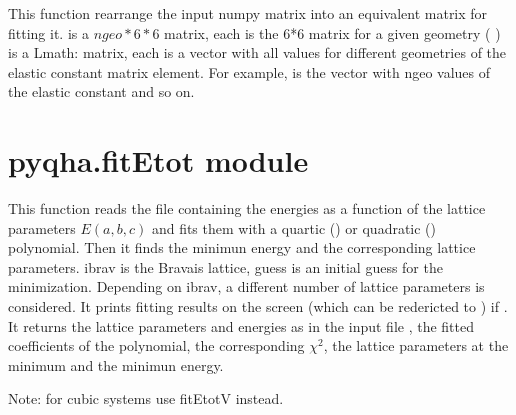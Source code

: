 \documentclass[letterpaper,10pt,english]{sphinxmanual}
\begin{document}

\begin{fulllineitems}
This function rearrange the input numpy matrix  into an equivalent matrix 
for fitting it.
 is a \(ngeo*6*6\) matrix, each  is the 6*6  matrix for a given geometry (  )
 is a Lmath: matrix, each  is a vector with all values for different
geometries of the  elastic constant matrix element. For example, 
is the vector with ngeo values of the  elastic constant and so on.

\end{fulllineitems}



\section{pyqha.fitEtot module}
\label{pyqha:pyqha-fitetot-module}\label{pyqha:module-pyqha.fitEtot}

\begin{fulllineitems}
This function reads the file  containing the energies as a function
of the lattice parameters \(E(a,b,c)\) and fits them with a quartic () or 
quadratic () polynomial. Then it finds the minimun energy
and the corresponding lattice parameters. 
ibrav is the Bravais lattice, guess is an initial guess for the minimization.
Depending on ibrav, a different number of lattice parameters is considered.
It prints fitting results on the screen (which can be redericted to )
if .
It returns the lattice parameters and energies as in the input file ,
the fitted coefficients of the polynomial, the corresponding \(\chi^2\),
the lattice parameters at the minimum and the minimun energy.

Note: for cubic systems use fitEtotV instead.

\end{fulllineitems}
\end{document}
